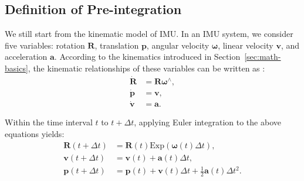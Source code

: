 \subsection{Definition of Pre-integration}
We still start from the kinematic model of IMU. In an IMU system, we consider five variables: rotation $\mathbf{R}$, translation $\mathbf{p}$, angular velocity $\boldsymbol{\omega}$, linear velocity $\mathbf{v}$, and acceleration $\mathbf{a}$. According to the kinematics introduced in Section~\ref{sec:math-basics}, the kinematic relationships of these variables can be written as \cite{Murray2017}:
\begin{subequations}\label{key}
	\begin{align}
		\dot{\mathbf{R}} &= \mathbf{R} \boldsymbol{\omega}^\wedge, \\
		\dot{\mathbf{p}} &= \mathbf{v}, \\
		\dot{\mathbf{v}} &= \mathbf{a}.
	\end{align}
\end{subequations}

Within the time interval $t$ to $t+\Delta t$, applying Euler integration to the above equations yields:
\begin{subequations}\label{key}
	\begin{align}
		\mathbf{R}(t+\Delta t) &= \mathbf{R}(t) \mathrm{Exp} (\boldsymbol{\omega}(t) \Delta t), \\
		\mathbf{v}(t+\Delta t) &= \mathbf{v}(t) + \mathbf{a}(t) \Delta t, \\
		\mathbf{p}(t+\Delta t) &= \mathbf{p}(t) + \mathbf{v}(t) \Delta t + \frac{1}{2} \mathbf{a}(t) \Delta t^2.
	\end{align}
\end{subequations}

